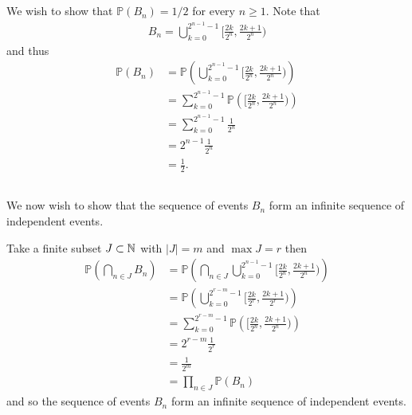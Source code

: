 \documentclass{unswmaths}
\begin{document}
\section{}
\subsection{}
We wish to show that $ \mathbb{P}(B_n) = 1/2 $ for every $ n \geq 1 $.
Note that 
\begin{align}
	B_n = \bigcup_{k=0}^{2^{n-1} - 1} \Big[ \frac{2k}{2^n}, \frac{2k+1}{2^n} \Big)
\end{align}
and thus
\begin{align}
	\mathbb{P}(B_n) &= \mathbb{P}\left( \bigcup_{k=0}^{2^{n-1} - 1} \Big[ \frac{2k}{2^n}, \frac{2k+1}{2^n} \Big) \right) \\
		&= \sum_{k=0}^{2^{n-1}-1} \mathbb{P}\left( \Big[ \frac{2k}{2^n}, \frac{2k+1}{2^n} \Big) \right) \\
		&= \sum_{k=0}^{2^{n-1}-1} \frac{1}{2^n} \\
		&= 2^{n-1} \frac{1}{2^n} \\
		&= \frac{1}{2}.
\end{align}
\subsection{}
We now wish to show that the sequence of events $ B_n $ form an infinite sequence of independent events. 

Take a finite subset $ J \subset \mathbb{N} $ with $ |J| = m $ and $ \max J = r $ then
\begin{align}
	\mathbb{P}\left( \bigcap_{n \in J} B_n \right) &= \mathbb{P}\left( \bigcap_{n \in J} \bigcup_{k=0}^{2^{n-1} - 1} \Big[ \frac{2k}{2^n}, \frac{2k+1}{2^n} \Big) \right) \\
	&= \mathbb{P} \left( \bigcup_{k=0}^{2^{r-m} - 1} \Big[ \frac{2k}{2^r}, \frac{2k+1}{2^r} \Big)\right) \\
	&=  \sum_{k=0}^{2^{r-m} - 1} \mathbb{P} \left( \Big[ \frac{2k}{2^n}, \frac{2k+1}{2^n} \Big) \right) \\
	&= 2^{r-m} \frac{1}{2^r} \\
	&= \frac{1}{2^m} \\
	&= \prod_{n \in J} \mathbb{P}\left( B_n \right)
\end{align}
and so the sequence of events $ B_n $ form an infinite sequence of independent events.
\subsection{}
\end{document}
